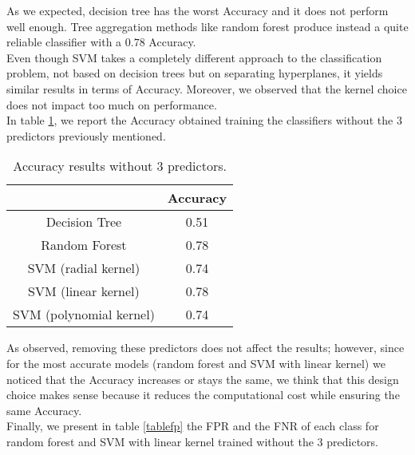 \documentclass{article}
\begin{document}
As we expected, decision tree has the worst Accuracy and it does not perform well enough. Tree aggregation methods like random forest produce instead a quite reliable classifier with a $0.78$ Accuracy. 
\\Even though SVM takes a completely different approach to the classification problem, not based on decision trees but on separating hyperplanes, it yields similar results in terms of Accuracy. Moreover, we observed that the kernel choice does not impact too much on performance.
\\In table \ref{table2}, we report the Accuracy obtained training the classifiers without the $3$ predictors previously mentioned.
\newpage

\begin{table}[ht]
 \centering
\begin{tabular}{ |c|c|} \hline
 &  Accuracy \\
\hline
Decision Tree & 0.51 \\ 
\hline
 Random Forest & 0.78 \\ 
\hline
 SVM (radial kernel) & 0.74 \\ 
\hline
 SVM (linear kernel) & 0.78  \\ 
\hline
 SVM (polynomial kernel) & 0.74 \\ 
\hline
\end{tabular}
\caption{Accuracy results without $3$ predictors.}\label{table2}
\end{table}

As observed, removing these predictors does not affect the results; however, since for the most accurate models (random forest and SVM with linear kernel) we noticed that the Accuracy increases or stays the same, we think that this design choice makes sense because it reduces the computational cost while ensuring the same Accuracy.
\\Finally, we present in table \ref{tablefp} the FPR and the FNR of each class for random forest and SVM with linear kernel trained without the $3$ predictors. 
\end{document}
